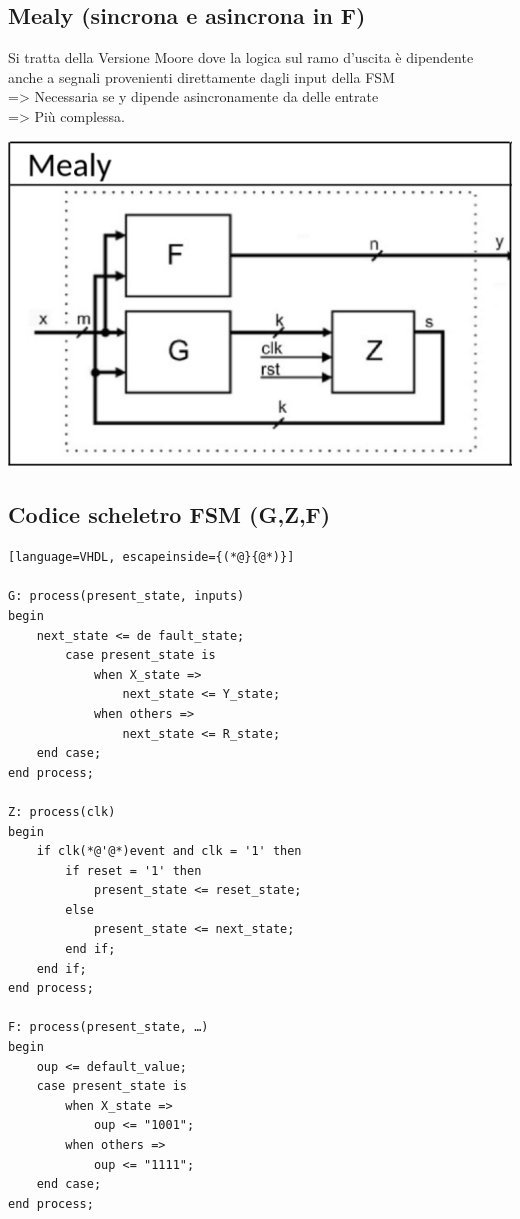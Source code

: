     \subsection{Mealy (sincrona e asincrona in F)}
    \begin{minipage}[t]{0.48\columnwidth}
        \vspace{0pt} %
        Si tratta della Versione Moore dove la logica sul ramo d'uscita è dipendente anche a segnali provenienti direttamente
        dagli input della FSM\\
        => Necessaria se y dipende asincronamente da delle entrate\\
        => Più complessa.
    \end{minipage}%
    \hfill
    \begin{minipage}[t]{0.48\columnwidth}
        \vspace{0pt} %
        \includegraphics[width=\linewidth]{Images/Mealy.png}
    \end{minipage}


    \subsection{Codice scheletro FSM (G,Z,F)}
        \begin{lstlisting}[language=VHDL, escapeinside={(*@}{@*)}]

G: process(present_state, inputs)
begin
    next_state <= de fault_state;
        case present_state is
            when X_state =>
                next_state <= Y_state;
            when others =>
                next_state <= R_state;
    end case;
end process;

Z: process(clk)
begin
    if clk(*@'@*)event and clk = '1' then
        if reset = '1' then
            present_state <= reset_state;
        else
            present_state <= next_state;
        end if;
    end if;
end process;

F: process(present_state, …)
begin
    oup <= default_value;
    case present_state is
        when X_state =>
            oup <= "1001";
        when others =>
            oup <= "1111";
    end case;
end process;

        \end{lstlisting}


